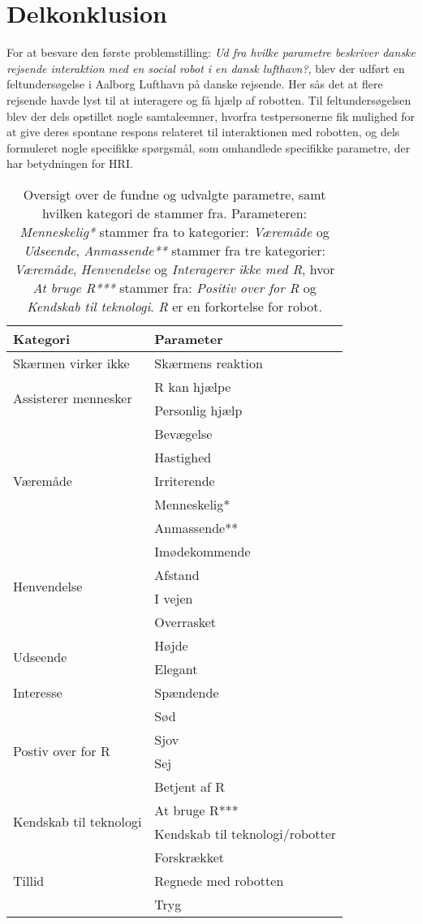 \chapter{Delkonklusion}
\label{ParametreDelKonklusion}
%
For at besvare den første problemstilling: \textit{Ud fra hvilke parametre beskriver danske rejsende interaktion med en social robot i en dansk lufthavn?}, blev der udført en feltundersøgelse i Aalborg Lufthavn på danske rejsende. Her sås det at flere rejsende havde lyst til at interagere og få hjælp af robotten. Til feltundersøgelsen blev der dels opstillet nogle samtaleemner, hvorfra testpersonerne fik mulighed for at give deres spontane respons relateret til interaktionen med robotten, og dels formuleret nogle specifikke spørgsmål, som omhandlede specifikke parametre, der har betydningen for HRI. 
%
\begin{table}[H]
	\centering
	\begin{tabular}{ l|l }
		\centering
		Kategori & Parameter\\ \hline
		Skærmen virker ikke & Skærmens reaktion\\ \hline
		\multirow{2}{*}{Assisterer mennesker} & R kan hjælpe \\
		& Personlig hjælp \\ \hline
		\multirow{5}{*}{Væremåde} & Bevægelse \\
		& Hastighed \\
		& Irriterende \\
		& Menneskelig* \\
		& Anmassende** \\ \hline
		\multirow{4}{*}{Henvendelse} & Imødekommende \\
		& Afstand \\
		& I vejen \\
		& Overrasket\\ \hline
		\multirow{2}{*}{Udseende} & Højde \\
		& Elegant \\ \hline
		Interesse & Spændende\\ \hline
		\multirow{4}{*}{Postiv over for R} & Sød \\
		& Sjov \\
		& Sej \\
		& Betjent af R\\ \hline
		\multirow{2}{*}{Kendskab til teknologi} & At bruge R*** \\
		& Kendskab til teknologi/robotter \\ \hline
		\multirow{3}{*}{Tillid} & Forskrækket \\
		& Regnede med robotten \\
		& Tryg
	\end{tabular}
	\caption{Oversigt over de fundne og udvalgte parametre, samt hvilken kategori de stammer fra. Parameteren: \textit{Menneskelig*} stammer fra to kategorier: \textit{Væremåde} og \textit{Udseende}, \textit{Anmassende**} stammer fra tre kategorier: \textit{Væremåde}, \textit{Henvendelse} og \textit{Interagerer ikke med R}, hvor \textit{At bruge R***} stammer fra: \textit{Positiv over for R} og \textit{Kendskab til teknologi}. \textit{R} er en forkortelse for robot.}
	\label{tab:OversigtOverValgteParametre}
\end{table}
